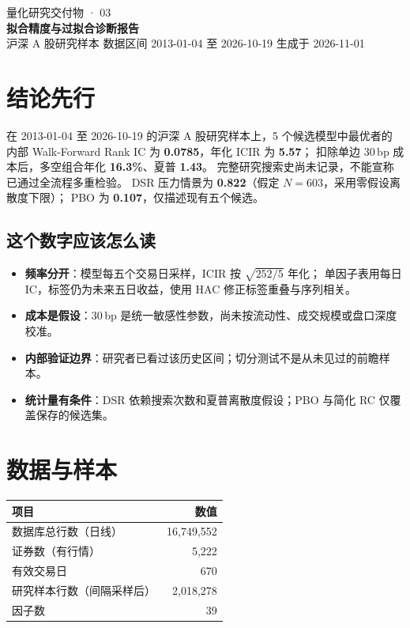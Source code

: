 \documentclass[UTF8,10pt,a4paper]{ctexart}
\begin{document}
\begin{center}
{\sffamily\color{accent}\large 量化研究交付物 · 03}\\[6pt]
{\sffamily\bfseries\LARGE 拟合精度与过拟合诊断报告}\\[6pt]
{\small\color{gray} 沪深 A 股研究样本 \quad 数据区间 2013-01-04 至 2026-10-19 \quad 生成于 2026-11-01}
\end{center}
\vspace{4pt}

\section{结论先行}

\begin{kb}[一句话结论]
在 2013-01-04 至 2026-10-19 的沪深 A 股研究样本上，5 个候选模型中最优者的
内部 Walk-Forward Rank IC 为 \textbf{0.0785}，年化 ICIR 为 \textbf{5.57}；
扣除单边 30\,bp 成本后，多空组合年化 \textbf{16.3\%}、夏普 \textbf{1.43}。
完整研究搜索史尚未记录，不能宣称已通过全流程多重检验。
DSR 压力情景为 \textbf{0.822}（假定 $N=603$，采用零假设离散度下限）；
PBO 为 \textbf{0.107}，仅描述现有五个候选。
\end{kb}

\subsection{这个数字应该怎么读}

\begin{itemize}
  \item \textbf{频率分开}：模型每五个交易日采样，ICIR 按 $\sqrt{252/5}$ 年化；
        单因子表用每日 IC，标签仍为未来五日收益，使用 HAC 修正标签重叠与序列相关。
  \item \textbf{成本是假设}：30\,bp 是统一敏感性参数，尚未按流动性、成交规模或盘口深度校准。
  \item \textbf{内部验证边界}：研究者已看过该历史区间；切分测试不是从未见过的前瞻样本。
  \item \textbf{统计量有条件}：DSR 依赖搜索次数和夏普离散度假设；PBO 与简化 RC 仅覆盖保存的候选集。
\end{itemize}

\section{数据与样本}

\begin{center}
\begin{tabular}{@{}lr@{}}
\toprule
项目 & 数值 \\
\midrule
数据库总行数（日线） & 16,749,552 \\
证券数（有行情） & 5,222 \\
有效交易日 & 670 \\
研究样本行数（间隔采样后） & 2,018,278 \\
因子数 & 39 \\
\bottomrule
\end{tabular}
\end{center}
\end{document}
